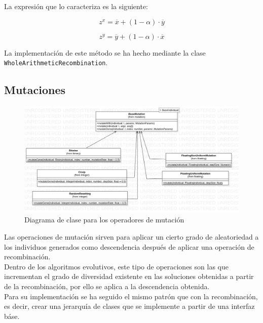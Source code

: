 La expresión que lo caracteriza es la siguiente:

\begin{equation}
    z^x = \overline{x} + (1 - \alpha) \cdot \overline{y}
\end{equation}

\begin{equation}
    z^y = \overline{y} + (1 - \alpha) \cdot \overline{x}
\end{equation}

La implementación de este método se ha hecho mediante la clase \texttt{WholeArithmeticRecombination}.

\subsection{Mutaciones}

\begin{figure}[ht]
    \centering
    \includegraphics[scale=0.3]{mem/images/cap-4/4.2.7(Mutation)/Mutation.png}
    \caption{Diagrama de clase para los operadores de mutación }
    \label{fig:my_label}
\end{figure}

Las operaciones de mutación sirven para aplicar un cierto grado de aleatoriedad a los individuos generados como descendencia después de aplicar una operación de recombinación. \\

Dentro de los algoritmos evolutivos, este tipo de operaciones son las que incrementan el grado de diversidad existente en las soluciones obtenidas a partir de la recombinación, por ello se aplica a la descendencia obtenida. \\

Para su implementación se ha seguido el mismo patrón que con la recombinación, es decir, crear una jerarquía de clases que se implemente a partir de una interfaz báse.

